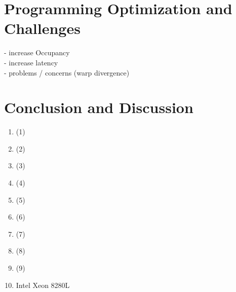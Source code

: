 \documentclass[a4paper,12pt]{llncs}
\numberwithin{equation}{section}
\begin{document}
\section{Programming Optimization and Challenges}
  - increase Occupancy\\
  - increase latency\\
  - problems / concerns (warp divergence)\\



\section{Conclusion and Discussion}

      


\begin{enumerate}
\item \cite{Rauber.2012} (1)
\item \cite{Lindholm.2008} (2)
\item \cite{Burgess.2020} (3)
\item \cite{Huang.2008} (4)
\item \cite{Bialas.2016} (5)
\item \cite{Khronos.2019} (6)
\item \cite{Wang.2019} (7)
\item \cite{NVIDIA.2018} (8)
\item \cite{NVIDIA.2019} (9)
\item Intel Xeon 8280L
\end{enumerate}





\newpage



\end{document}
